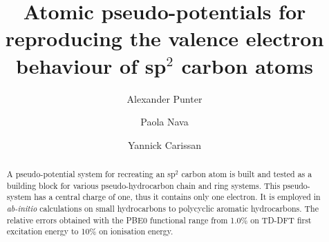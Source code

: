 \documentclass[aip,reprint]{revtex4-1}
\begin{document}
\title{Atomic pseudo-potentials for reproducing the valence electron behaviour of sp$^2$ carbon atoms}
\author{Alexander Punter}
\author{Paola Nava}
\author{Yannick Carissan}

\begin{abstract}
A pseudo-potential system for recreating an sp\(^{2}\) carbon atom is built 
and tested as a building block for various pseudo-hydrocarbon chain and ring systems.  
This pseudo-system has a central charge of one, thus it contains only one
electron. It is employed in \textsl{ab-initio} calculations 
on small hydrocarbons to polycyclic aromatic hydrocarbons.
The relative errors obtained with the PBE0 functional range from
1.0\% on TD-DFT first excitation energy to 10\% on ionisation
energy.
\end{abstract}
\maketitle



\begin{figure}[h]
\centering
\colorbox{background-color}{
}
\end{figure}
\end{document}
